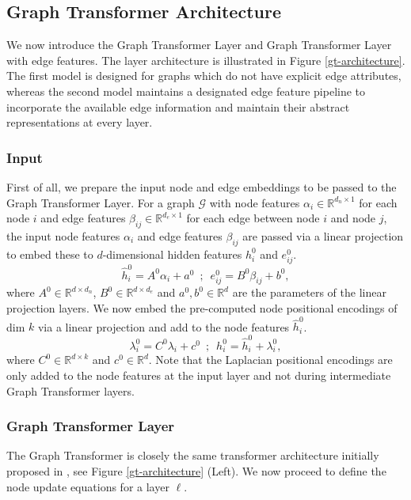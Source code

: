 \documentclass[letterpaper]{article}
\begin{document}
\subsection{Graph Transformer Architecture}
We now introduce the Graph Transformer Layer and Graph Transformer Layer with edge features. The layer architecture is illustrated in Figure \ref{gt-architecture}. The first model is designed for graphs which do not have explicit edge attributes, whereas the second model maintains a designated edge feature pipeline to incorporate the available edge information and maintain their abstract representations at every layer.

\subsubsection{Input} First of all, we prepare the input node and edge embeddings to be passed to the Graph Transformer Layer. For a graph $\mathcal{G}$ with node features $\alpha_i \in \mathbb{R}^{d_n \times 1}$ for each node $i$ and edge features $\beta_{ij} \in \mathbb{R}^{d_e \times 1}$ for each edge between node $i$ and node $j$, the input node features $\alpha_i$ and edge features $\beta_{ij}$ are passed via a linear projection to embed these to $d$-dimensional hidden features $h_i^{0}$ and $e_{ij}^{0}$.
\begin{equation}
    \label{eqn:input_embd}
    \hat{h}_i^{0} = A^{0} \alpha_i + a^{0} \;\ ; \;\ e_{ij}^{0} = B^{0} \beta_{ij} + b^{0} ,
\end{equation}
where $A^{0} \in \mathbb{R}^{d \times d_n}$, $B^{0} \in \mathbb{R}^{d \times d_e}$ and $a^{0},b^{0}\in \mathbb{R}^{d}$
are the parameters of the linear projection layers.
We now embed the pre-computed node positional encodings of dim $k$ via a linear projection and add to the node features $\hat{h}_i^{0}$.
\begin{equation}
\label{eqn:pe_embd_add}
{\lambda}_i^{0} = C^{0} \lambda_i + c^{0} \;\  ; \;\ h_i^{0} = \hat{h}_i^{0} + {\lambda}_i^{0},
\end{equation}
where $C^{0} \in \mathbb{R}^{d \times k}$ and $c^{0}\in \mathbb{R}^{d}$. Note that the Laplacian positional encodings are only added to the node features at the input layer and not during intermediate Graph Transformer layers.

\subsubsection{Graph Transformer Layer} The Graph Transformer is closely the same transformer architecture initially proposed in \cite{vaswani2017attention}, see Figure \ref{gt-architecture} (Left).
We now proceed to define the node update equations for a layer $\ell$.
\end{document}
